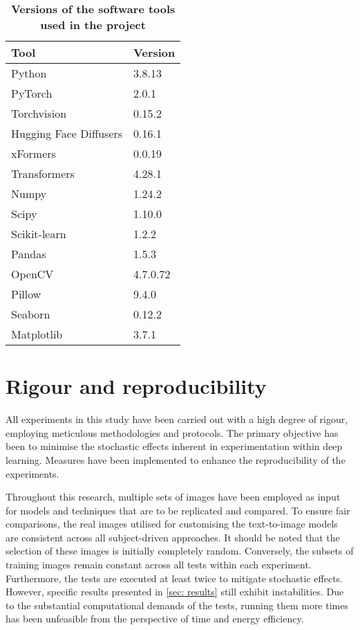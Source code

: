 \begin{table}[ht]
\centering
\begin{tabular}{|l|l|}
\hline
\rowcolor[HTML]{BFBFBF} 
\textbf{Tool} & \textbf{Version} \\ \hline
\rowcolor[HTML]{FFFFFF} 
Python & 3.8.13 \\ \hline
\rowcolor[HTML]{FFFFFF} 
PyTorch & 2.0.1 \\ \hline
\rowcolor[HTML]{FFFFFF} 
Torchvision & 0.15.2 \\ \hline
\rowcolor[HTML]{FFFFFF} 
Hugging Face Diffusers & 0.16.1 \\ \hline
\rowcolor[HTML]{FFFFFF} 
xFormers & 0.0.19 \\ \hline
\rowcolor[HTML]{FFFFFF} 
Transformers & 4.28.1 \\ \hline
\rowcolor[HTML]{FFFFFF} 
Numpy & 1.24.2 \\ \hline
\rowcolor[HTML]{FFFFFF} 
Scipy & 1.10.0 \\ \hline
\rowcolor[HTML]{FFFFFF} 
Scikit-learn & 1.2.2 \\ \hline
\rowcolor[HTML]{FFFFFF} 
Pandas & 1.5.3 \\ \hline
\rowcolor[HTML]{FFFFFF} 
OpenCV & 4.7.0.72 \\ \hline
\rowcolor[HTML]{FFFFFF} 
Pillow & 9.4.0 \\ \hline
\rowcolor[HTML]{FFFFFF} 
Seaborn & 0.12.2 \\ \hline
\rowcolor[HTML]{FFFFFF} 
Matplotlib & 3.7.1 \\ \hline
\end{tabular}
\caption{\textbf{Versions of the software tools used in the project}}
\label{table:TableHSoftware}
\end{table}

\chapter{Rigour and reproducibility} \label{rigour}

All experiments in this study have been carried out with a high degree of rigour, employing meticulous methodologies and protocols. The primary objective has been to minimise the stochastic effects inherent in experimentation within deep learning. Measures have been implemented to enhance the reproducibility of the experiments.

Throughout this research, multiple sets of images have been employed as input for models and techniques that are to be replicated and compared. To ensure fair comparisons, the real images utilised for customising the text-to-image models are consistent across all subject-driven approaches. It should be noted that the selection of these images is initially completely random. Conversely, the subsets of training images remain constant across all tests within each experiment. Furthermore, the tests are executed at least twice to mitigate stochastic effects. However, specific results presented in \ref{sec: results} still exhibit instabilities. Due to the substantial computational demands of the tests, running them more times has been unfeasible from the perspective of time and energy efficiency.

